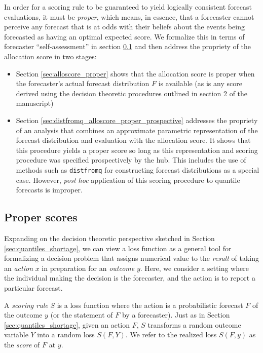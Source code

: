 \documentclass{article}\usepackage[]{graphicx}\usepackage[]{xcolor}
\begin{document}
In order for a scoring rule to be guaranteed to yield logically consistent forecast evaluations, it must be \emph{proper}, which means,
in essence, that a forecaster cannot perceive any forecast that is at odds with their beliefs about the events being forecasted as having an optimal expected score.
We formalize this in terms of forecaster ``self-assessment'' in section \ref{sec:proper_def} and then address the propriety of the allocation score in two stages:
\begin{itemize}
  \item Section \ref{sec:alloscore_proper} shows that the allocation score is proper when the forecaster's actual forecast distribution $F$ is available (as is any score derived using the decision theoretic procedures outlined in section 2 of the manuscript)
  \item Section \ref{sec:distfromq_alloscore_proper_prospective} addresses the propriety of an analysis that combines an approximate parametric representation of the forecast distribution and evaluation with the allocation score. It shows that this procedure yields a proper score so long as this representation and scoring procedure was specified prospectively by the hub. This includes the use of methods such as \verb`distfromq` for constructing forecast distributions as a special case. However,  \emph{post hoc} application of this scoring procedure to quantile forecasts is improper.
\end{itemize}

\subsection{Proper scores}
\label{sec:proper_def}

Expanding on the decision theoretic perspective sketched in Section \ref{sec:quantiles_shortage}, we can view a loss function 
as a general tool for formalizing a decision problem that assigns numerical value to the \emph{result} of taking an \emph{action} $x$
in preparation for an \emph{outcome} $y$. Here, we consider a setting where the individual making the decision is the forecaster, and the action is to report a particular forecast.

A \emph{scoring rule} $S$ is a loss function where the action 
is a probabilistic forecast $F$ of the outcome $y$ (or the statement of $F$ by a forecaster). Just as in 
Section \ref{sec:quantiles_shortage}, given an action $F$, $S$ transforms a random outcome variable $Y$ into a random loss $S(F,Y)$. 
We refer to the realized loss $S(F,y)$ as the \emph{score} of $F$ at $y$.
\end{document}
